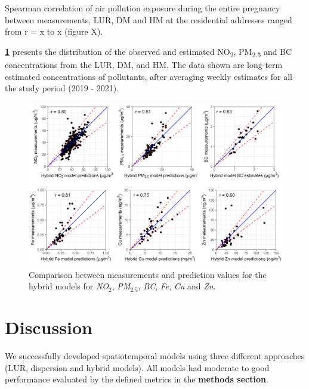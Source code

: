 \documentclass{article}
\begin{document}
Spearman correlation of air pollution exposure during the entire pregnancy between measurements, LUR, DM and HM at the residential addresses ranged from r = x to x (figure X). 





















\textbf{\cref{fig2}} presents the distribution of the observed and estimated NO\textsubscript{2}, PM\textsubscript{2.5} and BC concentrations from the LUR, DM, and HM. The data shown are long-term estimated concentrations of pollutants, after averaging weekly estimates for all the study period (2019 - 2021).   

\captionsetup[figure]{skip=6pt}
\begin{figure}[!htb]
\includegraphics[width=1.0\textwidth]{figures/fig_HM_test_all_models.png}
\caption{Comparison between measurements and prediction values for the hybrid models for \textit{NO$_2$}, \textit{PM$_{2.5}$}, \textit{BC}, \textit{Fe}, \textit{Cu} and \textit{Zn}.}
\label{fig2}
\end{figure}

\section{Discussion}
We successfully developed spatiotemporal models using three different approaches (LUR, dispersion and hybrid models). All models had moderate to good performance evaluated by the defined metrics in the \textbf{methods section}.
\end{document}
